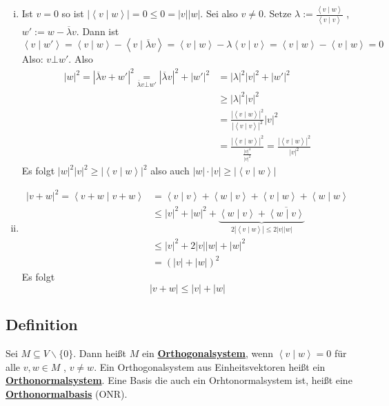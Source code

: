 \begin{enumerate}[(i)]
	\item Ist $v=0$ so ist $| \left\langle v \mid w \right\rangle | = 0 \le 0 = |v| |w|$. Sei also $v \not= 0$. Setze $\lambda  := 
	\frac{\left\langle v \mid w \right\rangle }{\left\langle v \mid v \right\rangle }$ ,  $w' := w - \overline{\lambda}  v$. Dann ist 
	\[
		\left\langle v \mid w' \right\rangle = \left\langle v \mid w \right\rangle - \left\langle v \mid \overline{\lambda}  v \right\rangle 
		= \left\langle v \mid w \right\rangle - \lambda \left\langle v \mid v \right\rangle = \left\langle v \mid w \right\rangle  - \left\langle v \mid w \right\rangle 
		= 0
	\]
	Also: $v \bot w'$. Also 
	\begin{align*}
		|w|^2 = | \overline{\lambda} v + w' |^2 \underset{\overline{\lambda} v \bot w' }{=} |\overline{\lambda}v|^2 + |w'|^2 &= |\lambda |^2  |v|^2 + |w'|^2 \\
		&\ge |\lambda|^2 |v|^2 \\
		&= \frac{| \left\langle v \mid w \right\rangle | ^2}{| \left\langle v \mid v \right\rangle |^2} |v|^2 \\
		&= \frac{|\left\langle v \mid w \right\rangle |^2}{\frac{|v|^4}{|v|^2} } = \frac{|\left\langle v \mid w \right\rangle |^2}{|v|^2}  
	\end{align*}
	Es folgt $|w|^2 |v|^2 \ge |\left\langle v \mid w \right\rangle |^2$ also auch $|w|\cdot |v| \ge | \left\langle v \mid w \right\rangle |$
	\item 
	\begin{align*}
		|v+w|^2 = \left\langle v+w \mid v+w \right\rangle &= \left\langle v \mid v \right\rangle + \left\langle w \mid v \right\rangle +
		 \left\langle v \mid w \right\rangle + \left\langle w \mid w \right\rangle  \\
		 &\le |v|^2 + |w|^2 + \underbrace{\left\langle w \mid v \right\rangle  + 
		 \overline{ \left\langle w \mid v \right\rangle } }_{2 |\left\langle v \mid w \right\rangle | \le 2 |v| |w|} \\
		 &\le |v|^2 + 2 |v| |w| + |w|^2 \\
		 &= (|v| + |w|)^2
	\end{align*}
	Es folgt
	\[
		|v+w| \le |v| + |w|
	\]
\end{enumerate}

\subsection{Definition} %
\label{sub:definition}
Sei $M \subseteq V \backslash \{0\}$. Dann heißt $M$ ein \underline{\textbf{Orthogonalsystem}}, wenn $\left\langle v \mid w \right\rangle = 0$ für alle $v,w \in M$ , 
$v \not= w$. Ein Orthogonalsystem aus Einheitsvektoren heißt ein \underline{\textbf{Orthonormalsystem}}. Eine Basis die auch ein Orhtonormalsystem ist, heißt eine \underline{\textbf{Orthonormalbasis}} (ONR).

